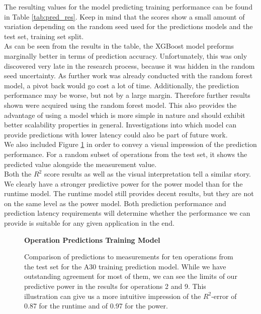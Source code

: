The resulting values for the model predicting training performance can be found in Table \ref{tab:pred_res}. Keep in mind that the scores show a small amount of variation depending on the random seed used for the predictions models and the test set, training set split. \\
As can be seen from the results in the table, the XGBoost model preforms marginally better in terms of prediction accuracy. Unfortunately, this was only discovered very late in the research process, because it was hidden in the random seed uncertainty. As further work was already conducted with the random forest model, a pivot back would go cost a lot of time. Additionally, the prediction performance may be worse, but not by a large margin. Therefore further results shown were acquired using the random forest model. This also provides the advantage of using a model which is more simple in nature and should exhibit better scalability properties in general. Investigations into which model can provide predictions with lower latency could also be part of future work. \\
We also included Figure \ref{fig:testsetoperations} in order to convey a visual impression of the prediction performance. For a random subset of operations from the test set, it shows the predicted value alongside the measurement value. \\
Both the $R^2$ score results as well as the visual interpretation tell a similar story. We clearly have a stronger predictive power for the power model than for the runtime model. The runtime model still provides decent results, but they are not on the same level as the power model. Both prediction performance and prediction latency requirements will determine whether the performance we can provide is suitable for any given application in the end.


\begin{figure}[htbp]
    \centering
    \parbox{1.1\textwidth}{\centering\textbf{Operation Predictions Training Model}}
    \caption{Comparison of predictions to measurements for ten operations from the test set for the A30 training prediction model. While we have outstanding agreement for most of them, we can see the limits of our predictive power in the results for operations 2 and 9. This illustration can give us a more intuitive impression of the $R^2$-error of 0.87 for the runtime and of 0.97 for the power.}
    \label{fig:testsetoperations}
\end{figure}


